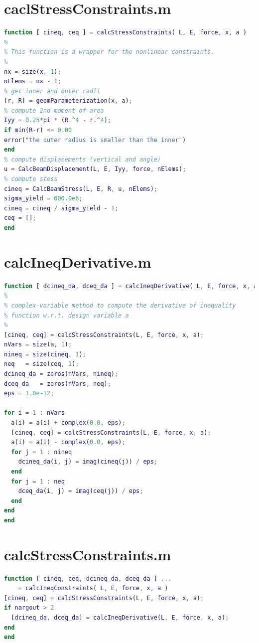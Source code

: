 \documentclass[a4paper]{article}
\begin{document}
\begin{appendices}
\section{caclStressConstraints.m}\label{app:noncon}
\begin{lstlisting}[language=Matlab]
function [ cineq, ceq ] = calcStressConstraints( L, E, force, x, a )
%
% This function is a wrapper for the nonlinear constraints.
%
nx = size(x, 1);
nElems = nx - 1;
% get inner and outer radii
[r, R] = geomParameterization(x, a);
% compute 2nd moment of area
Iyy = 0.25*pi * (R.^4 - r.^4);
if min(R-r) <= 0.00
error("the outer radius is smaller than the inner")
end
% compute displacements (vertical and angle)
u = CalcBeamDisplacement(L, E, Iyy, force, nElems);
% compute stess
cineq = CalcBeamStress(L, E, R, u, nElems);
sigma_yield = 600.0e6;
cineq = cineq / sigma_yield - 1;
ceq = [];
end
\end{lstlisting}

\section{calcIneqDerivative.m}\label{app:nonconderiv}
\begin{lstlisting}[language=Matlab]
function [ dcineq_da, dceq_da ] = calcIneqDerivative( L, E, force, x, a )
%
% complex-variable method to compute the derivative of inequality
% function w.r.t. design variable a
%
[cineq, ceq] = calcStressConstraints(L, E, force, x, a);
nVars = size(a, 1);
nineq = size(cineq, 1);
neq   = size(ceq, 1);
dcineq_da = zeros(nVars, nineq);
dceq_da   = zeros(nVars, neq);
eps = 1.0e-12;

for i = 1 : nVars
  a(i) = a(i) + complex(0.0, eps);
  [cineq, ceq] = calcStressConstraints(L, E, force, x, a);
  a(i) = a(i) - complex(0.0, eps);
  for j = 1 : nineq
    dcineq_da(i, j) = imag(cineq(j)) / eps;
  end
  for j = 1 : neq
    dceq_da(i, j) = imag(ceq(j)) / eps;
  end
end
end
\end{lstlisting}

\section{calcStressConstraints.m}\label{app:nonlcon}
\begin{lstlisting}[language=Matlab]
function [ cineq, ceq, dcineq_da, dceq_da ] ...
    = calcIneqConstraints( L, E, force, x, a )
[cineq, ceq] = calcStressConstraints(L, E, force, x, a);
if nargout > 2
  [dcineq_da, dceq_da] = calcIneqDerivative(L, E, force, x, a);
end
end
\end{lstlisting}


\end{appendices}
\end{document}
